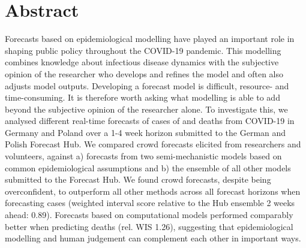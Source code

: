 \documentclass[10pt,letterpaper]{article}
\newcommand{\getIndex}[2]{
  \ForEach{,}{\IfEq{#1}{\thislevelitem}{\number\thislevelcount\ExitForEach}{}}{#2}
}
\newcommand{\getAff}[1]{
  \getIndex{#1}{London School of Hygiene \& Tropical %
Medicine,CMMID,Karlsruhe Institute of Technology Institute of Economic %
Theory and Statistics,Max Planck Institute for Multidisciplinary %
Sciences,UK Health Security Agency,Imperial College London} %
}
\providecommand{\DIFaddtex}[1]{{\protect\color{blue}\uwave{#1}}} %
\providecommand{\DIFdeltex}[1]{{\protect\color{red}\sout{#1}}}                      %
\providecommand{\DIFaddbegin}{} %
\providecommand{\DIFaddend}{} %
\providecommand{\DIFdelbegin}{} %
\providecommand{\DIFdelend}{} %
\providecommand{\DIFadd}[1]{\texorpdfstring{\DIFaddtex{#1}}{#1}} %
\providecommand{\DIFdel}[1]{\texorpdfstring{\DIFdeltex{#1}}{}} %
\newcommand{\DIFscaledelfig}{0.5}
\newlength{\DIFdelgraphicswidth} %
\newlength{\DIFdelgraphicsheight} %
\newcommand{\DIFaddincludegraphics}[2][]{{\color{blue}\fbox{\DIFOincludegraphics[#1]{#2}}}} %
\newcommand{\DIFdelincludegraphics}[2][]{%
\sbox{\DIFdelgraphicsbox}{\DIFOincludegraphics[#1]{#2}}%
\settoboxwidth{\DIFdelgraphicswidth}{\DIFdelgraphicsbox} %
\settoboxtotalheight{\DIFdelgraphicsheight}{\DIFdelgraphicsbox} %
\scalebox{\DIFscaledelfig}{%
\parbox[b]{\DIFdelgraphicswidth}{\usebox{\DIFdelgraphicsbox}\\[-\baselineskip] \rule{\DIFdelgraphicswidth}{0em}}\llap{\resizebox{\DIFdelgraphicswidth}{\DIFdelgraphicsheight}{%
\setlength{\unitlength}{\DIFdelgraphicswidth}%
\begin{picture}(1,1)%
\thicklines\linethickness{2pt} %
{\color[rgb]{1,0,0}\put(0,0){\framebox(1,1){}}}%
{\color[rgb]{1,0,0}\put(0,0){\line( 1,1){1}}}%
{\color[rgb]{1,0,0}\put(0,1){\line(1,-1){1}}}%
\end{picture}%
}\hspace*{3pt}}} %
} %
\DeclareRobustCommand{\DIFaddbegin}{\DIFOaddbegin \let\includegraphics\DIFaddincludegraphics} %
\DeclareRobustCommand{\DIFaddend}{\DIFOaddend \let\includegraphics\DIFOincludegraphics} %
\DeclareRobustCommand{\DIFdelbegin}{\DIFOdelbegin \let\includegraphics\DIFdelincludegraphics} %
\DeclareRobustCommand{\DIFdelend}{\DIFOaddend \let\includegraphics\DIFOincludegraphics} %
\begin{document}
\section*{Abstract}
Forecasts based on epidemiological modelling have played an important
role in shaping public policy throughout the COVID-19 pandemic. This
modelling combines knowledge about infectious disease dynamics with the
subjective opinion of the researcher who develops and refines the model
and often also adjusts model outputs. Developing a forecast model is
difficult, resource- and time-consuming. It is therefore worth asking
what modelling is able to add beyond the subjective opinion of the
researcher alone. To investigate this, we analysed different real-time
forecasts of cases of and deaths from COVID-19 in Germany and Poland
over a 1-4 week horizon submitted to the German and Polish Forecast Hub.
We compared crowd forecasts elicited from researchers and volunteers,
against a) forecasts from two semi-mechanistic models based on common
epidemiological assumptions and b) the ensemble of all other models
submitted to the Forecast Hub. We found crowd forecasts, despite being
overconfident, to outperform all other methods across all forecast
horizons when forecasting cases (weighted interval score relative to the
Hub ensemble 2 weeks ahead: 0.89). Forecasts based on computational
models performed comparably better when predicting deaths (rel. WIS
1.26), suggesting that epidemiological modelling and human judgement can
complement each other in important ways.
\end{document}
